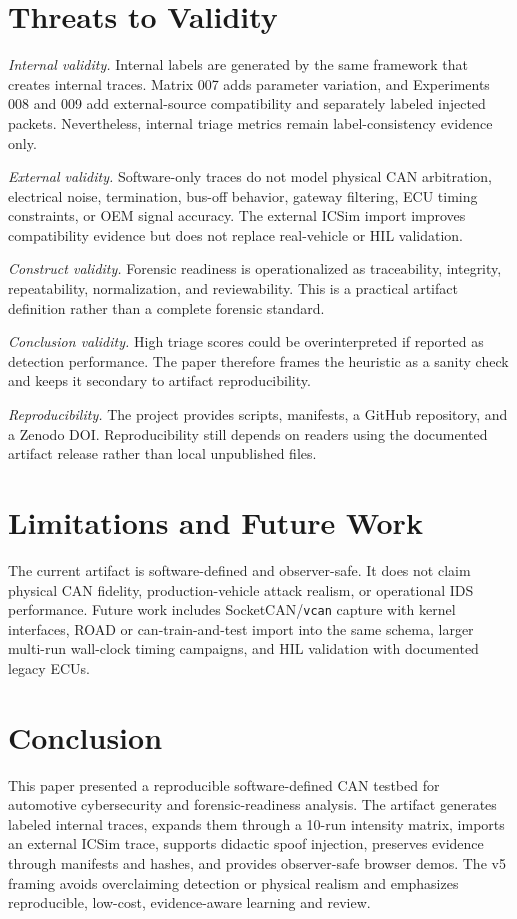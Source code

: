 \documentclass[conference]{IEEEtran}
\begin{document}
\section{Threats to Validity}
\textit{Internal validity.} Internal labels are generated by the same framework that creates internal traces. Matrix 007 adds parameter variation, and Experiments 008 and 009 add external-source compatibility and separately labeled injected packets. Nevertheless, internal triage metrics remain label-consistency evidence only.

\textit{External validity.} Software-only traces do not model physical CAN arbitration, electrical noise, termination, bus-off behavior, gateway filtering, ECU timing constraints, or OEM signal accuracy. The external ICSim import improves compatibility evidence but does not replace real-vehicle or HIL validation.

\textit{Construct validity.} Forensic readiness is operationalized as traceability, integrity, repeatability, normalization, and reviewability. This is a practical artifact definition rather than a complete forensic standard.

\textit{Conclusion validity.} High triage scores could be overinterpreted if reported as detection performance. The paper therefore frames the heuristic as a sanity check and keeps it secondary to artifact reproducibility.

\textit{Reproducibility.} The project provides scripts, manifests, a GitHub repository, and a Zenodo DOI. Reproducibility still depends on readers using the documented artifact release rather than local unpublished files.

\section{Limitations and Future Work}
The current artifact is software-defined and observer-safe. It does not claim physical CAN fidelity, production-vehicle attack realism, or operational IDS performance. Future work includes SocketCAN/\texttt{vcan} capture with kernel interfaces, ROAD or can-train-and-test import into the same schema, larger multi-run wall-clock timing campaigns, and HIL validation with documented legacy ECUs.

\section{Conclusion}
This paper presented a reproducible software-defined CAN testbed for automotive cybersecurity and forensic-readiness analysis. The artifact generates labeled internal traces, expands them through a 10-run intensity matrix, imports an external ICSim trace, supports didactic spoof injection, preserves evidence through manifests and hashes, and provides observer-safe browser demos. The v5 framing avoids overclaiming detection or physical realism and emphasizes reproducible, low-cost, evidence-aware learning and review.
\end{document}
